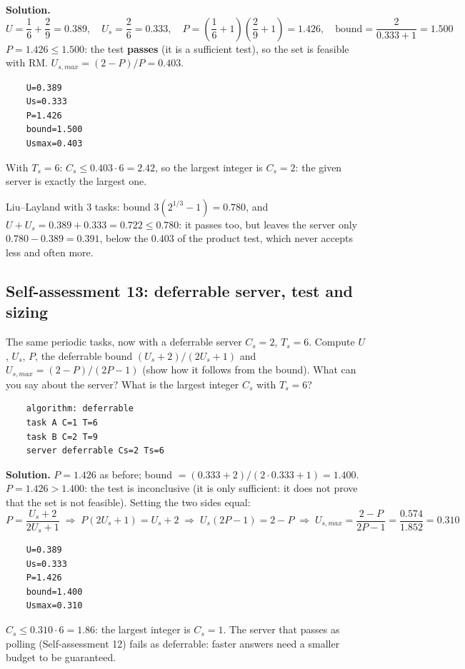 \textbf{Solution.}
\[
U = \frac{1}{6} + \frac{2}{9} = 0.389, \quad U_s = \frac{2}{6} = 0.333, \quad P = \left( \frac{1}{6} + 1 \right) \left( \frac{2}{9} + 1 \right) = 1.426, \quad \text{bound} = \frac{2}{0.333 + 1} = 1.500
\]
$P = 1.426 \le 1.500$: the test \textbf{passes} (it is a sufficient test), so the set is feasible with RM. $U_{s,max} = (2 - P)/P = 0.403$.
\begin{verbatim}
    U=0.389
    Us=0.333
    P=1.426
    bound=1.500
    Usmax=0.403
\end{verbatim}
With $T_s = 6$: $C_s \le 0.403 \cdot 6 = 2.42$, so the largest integer is $C_s = 2$: the given server is exactly the largest one.

Liu--Layland with 3 tasks: bound $3 (2^{1/3} - 1) = 0.780$, and $U + U_s = 0.389 + 0.333 = 0.722 \le 0.780$: it passes too, but leaves the server only $0.780 - 0.389 = 0.391$, below the $0.403$ of the product test, which never accepts less and often more.

\subsection*{Self-assessment 13: deferrable server, test and sizing}
The same periodic tasks, now with a deferrable server $C_s = 2$, $T_s = 6$. Compute $U$, $U_s$, $P$, the deferrable bound $(U_s + 2)/(2U_s + 1)$ and $U_{s,max} = (2 - P)/(2P - 1)$ (show how it follows from the bound). What can you say about the server? What is the largest integer $C_s$ with $T_s = 6$?
\begin{lstlisting}
    algorithm: deferrable
    task A C=1 T=6
    task B C=2 T=9
    server deferrable Cs=2 Ts=6
\end{lstlisting}

\textbf{Solution.} $P = 1.426$ as before; bound $= (0.333 + 2)/(2 \cdot 0.333 + 1) = 1.400$. $P = 1.426 > 1.400$: the test is inconclusive (it is only sufficient: it does not prove that the set is not feasible). Setting the two sides equal:
\[
P = \frac{U_s + 2}{2U_s + 1} \;\Rightarrow\; P(2U_s + 1) = U_s + 2 \;\Rightarrow\; U_s(2P - 1) = 2 - P \;\Rightarrow\; U_{s,max} = \frac{2 - P}{2P - 1} = \frac{0.574}{1.852} = 0.310
\]
\begin{verbatim}
    U=0.389
    Us=0.333
    P=1.426
    bound=1.400
    Usmax=0.310
\end{verbatim}
$C_s \le 0.310 \cdot 6 = 1.86$: the largest integer is $C_s = 1$. The server that passes as polling (Self-assessment 12) fails as deferrable: faster answers need a smaller budget to be guaranteed.


